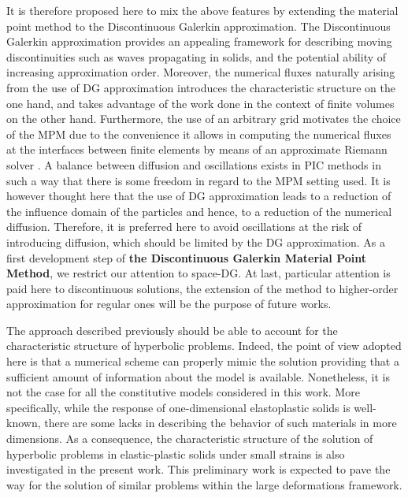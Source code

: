 It is therefore proposed here to mix the above features by extending the material point method to the Discontinuous Galerkin approximation.
The Discontinuous Galerkin approximation provides an appealing framework for describing moving discontinuities such as waves propagating in solids, and the potential ability of increasing approximation order.
Moreover, the numerical fluxes naturally arising from the use of DG approximation introduces the characteristic structure on the one hand, and takes advantage of the work done in the context of finite volumes on the other hand.
Furthermore, the use of an arbitrary grid motivates the choice of the MPM due to the convenience it allows in computing the numerical fluxes at the interfaces between finite elements by means of an approximate Riemann solver \cite{Toro}.
A balance between diffusion and oscillations exists in PIC methods in such a way that there is some freedom in regard to the MPM setting used.
It is however thought here that the use of DG approximation leads to a reduction of the influence domain of the particles and hence, to a reduction of the numerical diffusion. 
Therefore, it is preferred here to avoid oscillations at the risk of introducing diffusion, which should be limited by the DG approximation.
As a first development step of \textbf{the Discontinuous Galerkin Material Point Method}, we restrict our attention to space-DG.
At last, particular attention is paid here to discontinuous solutions, the extension of the method to higher-order approximation for regular ones will be the purpose of future works.

The approach described previously should be able to account for the characteristic structure of hyperbolic problems.
Indeed, the point of view adopted here is that a numerical scheme can properly mimic the solution providing that a sufficient amount of information about the model is available.
Nonetheless, it is not the case for all the constitutive models considered in this work.
More specifically, while the response of one-dimensional elastoplastic solids is well-known, there are some lacks in describing the behavior of such materials in more dimensions. 
As a consequence, the characteristic structure of the solution of hyperbolic problems in elastic-plastic solids under small strains is also investigated in the present work.
This preliminary work is expected to pave the way for the solution of similar problems within the large deformations framework.







